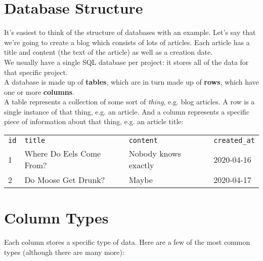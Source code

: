 \section{Database Structure}

It's easiest to think of the structure of databases with an example. Let's say that we're going to create a blog which consists of lots of articles. Each article has a title and content (the text of the article) as well as a creation date.
\\

We usually have a single SQL database per project: it stores all of the data for that specific project.
\\

A database is made up of \textbf{tables}, which are in turn made up of \textbf{rows}, which have one or more \textbf{columns}.
\\

A table represents a collection of some sort of \textit{thing}, e.g. blog articles. A row is a single instance of that thing, e.g. an article. And a column represents a specific piece of information about that thing, e.g. an article title:
\\

\begin{tabularx}{\textwidth}{l l l X}
    \texttt{id} & \texttt{title}            & \texttt{content}     & \texttt{created\_at} \\
    1           & Where Do Eels Come From?  & Nobody knows exactly & 2020-04-16 \\
    2           & Do Moose Get Drunk?       & Maybe                & 2020-04-17 \\
\end{tabularx}

\par\bigskip


\section{Column Types}

Each column stores a specific type of data. Here are a few of the most common types (although there are many more):
\\


